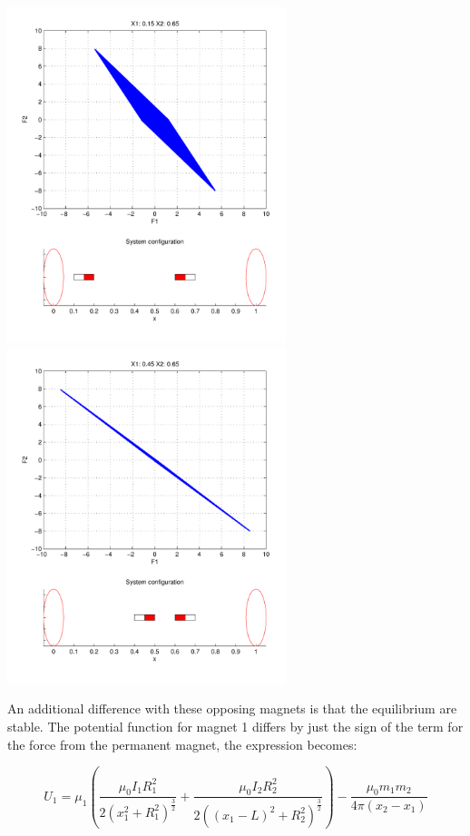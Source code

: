 \documentclass[english]{article}
\begin{document}
\begin{center}
\includegraphics[trim=0 0.5in 0 0,width=3.2in]{figures/Opposing_X1015X2065.pdf}\includegraphics[trim=0 0.5in 0 0,width=3.2in]{figures/Opposing_X1045X2065.pdf}
\end{center}

An additional difference with these opposing magnets is that the equilibrium are stable.  The potential function for magnet 1 differs by just the sign of the term for the force from the permanent magnet, the expression becomes:

$$U_1 = \mu_1\left(\frac{\mu_0 I_1 R_{1}^{2}}{2 \left(x_1^2 + R_1^2 \right)^{\frac{3}{2}}} + \frac{\mu_0 I_2 R_{2}^{2}}{2 \left(\left(x_1 - L \right)^2 + R_2^2 \right)^{\frac{3}{2}}} \right) - \frac{\mu_0 m_1 m_2}{4\pi \left(x_2 - x_1\right)}$$
\end{document}
